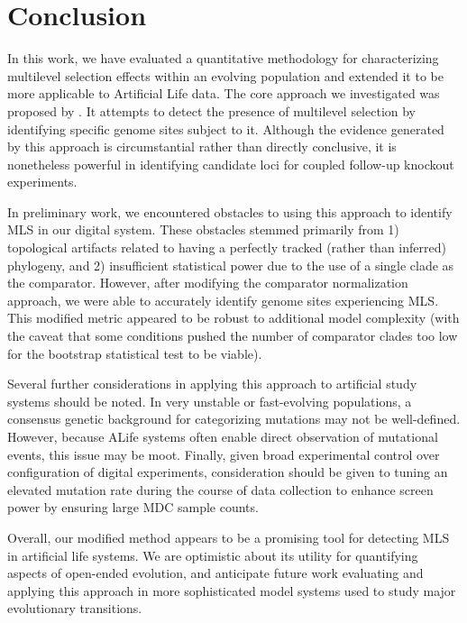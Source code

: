 \section{Conclusion} \label{sec:conclusion}

In this work, we have evaluated a quantitative methodology for characterizing multilevel selection effects within an evolving population and extended it to be more applicable to Artificial Life data.
The core approach we investigated was proposed by \citet{BonettiFranceschi2024phylogenetic}.
It attempts to detect the presence of multilevel selection by identifying specific genome sites subject to it.
Although the evidence generated by this approach is circumstantial rather than directly conclusive, it is nonetheless powerful in identifying candidate loci for coupled follow-up knockout experiments.

In preliminary work, we encountered obstacles to using this approach to identify MLS in our digital system.
These obstacles stemmed primarily from 1) topological artifacts related to having a perfectly tracked (rather than inferred) phylogeny, and 2) insufficient statistical power due to the use of a single clade as the comparator.
However, after modifying the comparator normalization approach, we were able to accurately identify genome sites experiencing MLS.
This modified metric appeared to be robust to additional model complexity (with the caveat that some conditions pushed the number of comparator clades too low for the bootstrap statistical test to be viable).

Several further considerations in applying this approach to artificial study systems should be noted.
In very unstable or fast-evolving populations, a consensus genetic background for categorizing mutations may not be well-defined.
However, because ALife systems often enable direct observation of mutational events, this issue may be moot.
Finally, given broad experimental control over configuration of digital experiments, consideration should be given to tuning an elevated mutation rate during the course of data collection to enhance screen power by ensuring large MDC sample counts.

Overall, our modified method appears to be a promising tool for detecting MLS in artificial life systems.
We are optimistic about its utility for quantifying aspects of open-ended evolution, and anticipate future work evaluating and applying this approach in more sophisticated model systems used to study major evolutionary transitions.



